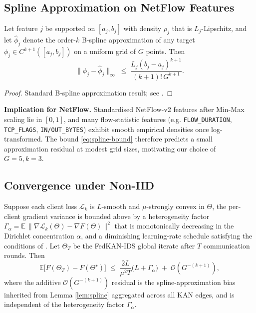 \subsection{Spline Approximation on NetFlow Features}

\begin{lemma}\label{lem:spline}
Let feature $j$ be supported on $[a_j, b_j]$ with density $\rho_j$ that is $L_j$-Lipschitz, and let $\hat\phi_j$ denote the order-$k$ B-spline approximation of any target $\phi_j \in C^{k+1}([a_j, b_j])$ on a uniform grid of $G$ points. Then
\begin{equation}\label{eq:spline-bound}
\|\phi_j - \hat\phi_j\|_\infty \;\leq\; \frac{L_j (b_j - a_j)^{k+1}}{(k+1)!\, G^{k+1}}.
\end{equation}
\end{lemma}

\begin{proof}
Standard B-spline approximation result; see \cite[Theorem 6.27]{schumaker2007}.
\end{proof}

\textbf{Implication for NetFlow.} Standardised NetFlow-v2 features \cite{sarhan2022standard} after Min-Max scaling lie in $[0, 1]$, and many flow-statistic features (e.g. \texttt{FLOW\_DURATION}, \texttt{TCP\_FLAGS}, \texttt{IN/OUT\_BYTES}) exhibit smooth empirical densities once log-transformed. The bound \eqref{eq:spline-bound} therefore predicts a small approximation residual at modest grid sizes, motivating our choice of $G=5, k=3$.

\subsection{Convergence under Non-IID}

\begin{theorem}\label{thm:conv}
Suppose each client loss $\mathcal{L}_k$ is $L$-smooth and $\mu$-strongly convex in $\Theta$, the per-client gradient variance is bounded above by a heterogeneity factor $\Gamma_\alpha = \mathbb{E}\,\|\nabla \mathcal{L}_k(\Theta) - \nabla F(\Theta)\|^2$ that is monotonically decreasing in the Dirichlet concentration $\alpha$, and a diminishing learning-rate schedule satisfying the conditions of \cite{li2020convergence}. Let $\Theta_T$ be the FedKAN-IDS global iterate after $T$ communication rounds. Then
\begin{equation}\label{eq:thm}
\mathbb{E}\big[F(\Theta_T) - F(\Theta^\star)\big] \;\leq\; \frac{2L}{\mu^2 T}\big(L + \Gamma_\alpha\big) \;+\; \mathcal{O}\!\left(G^{-(k+1)}\right),
\end{equation}
where the additive $\mathcal{O}(G^{-(k+1)})$ residual is the spline-approximation bias inherited from Lemma \ref{lem:spline} aggregated across all KAN edges, and is independent of the heterogeneity factor $\Gamma_\alpha$.
\end{theorem}

